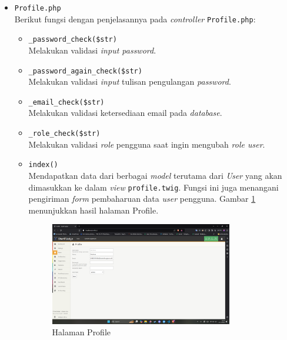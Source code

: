 \documentclass[a4paper,twoside]{article}
\begin{document}
\begin{enumerate}
\begin{itemize}
\begin{itemize}
\begin{itemize}
			                  \end{itemize}

			            \item \verb|Profile.php| \\
			                  Berikut fungsi dengan penjelasannya pada \textit{controller} \verb|Profile.php|:

			                  \begin{itemize}
				                  \item \verb|_password_check($str)| \\
				                        Melakukan validasi \textit{input password}.
				                  \item \verb|_password_again_check($str)| \\
				                        Melakukan validasi \textit{input} tulisan pengulangan \textit{password}.
				                  \item \verb|_email_check($str)| \\
				                        Melakukan validasi ketersediaan email pada \textit{database}.
				                  \item \verb|_role_check($str)| \\
				                        Melakukan validasi \textit{role} pengguna saat ingin mengubah \textit{role user}.
				                  \item \verb|index()| \\
				                        Mendapatkan data dari berbagai \textit{model} terutama dari \textit{User} yang akan dimasukkan ke dalam \textit{view} \verb|profile.twig|. Fungsi ini juga menangani pengiriman \textit{form} pembaharuan data \textit{user} pengguna. Gambar \ref{fig:3:1:1:profile} menunjukkan hasil halaman Profile.

				                        \begin{figure}[H]
					                        \centering
					                        \includegraphics[width=0.8\textwidth]{views/profile.png}
					                        \caption{Halaman Profile}
					                        \label{fig:3:1:1:profile}
				                        \end{figure}


\end{itemize}
\end{itemize}
\end{itemize}
\end{enumerate}
\end{document}
